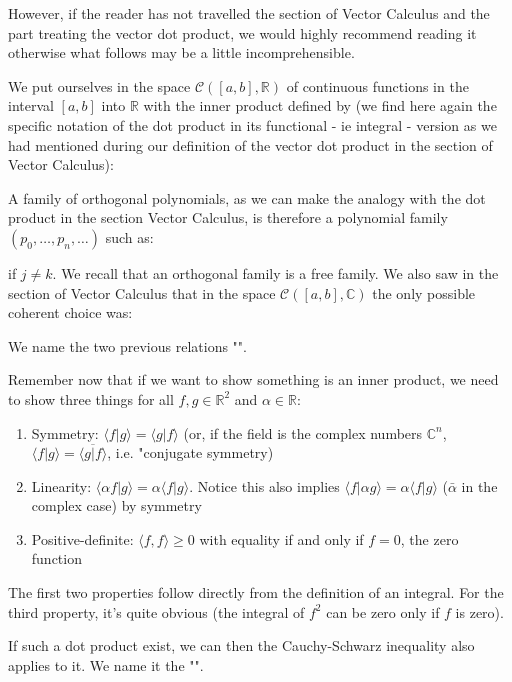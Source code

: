 	However, if the reader has not travelled the section of Vector Calculus and the part treating the vector dot product, we would highly recommend reading it otherwise what follows may be a little incomprehensible.
	
	We put ourselves in the space $\mathcal{C}([a,b],\mathbb{R})$ of continuous functions in the interval $[a, b]$ into $\mathbb{R}$ with the inner product defined by (we find here again the specific notation of the dot product in its functional - ie integral - version as we had mentioned during our definition of the vector dot product in the section of Vector Calculus):
	
	
	A family of orthogonal polynomials, as we can make the analogy with the dot product in the section Vector Calculus, is therefore a polynomial family $(p_0,\ldots ,p_n,\ldots )$ such as:
	
	if $j \ne k$. We recall that an orthogonal family is a free family. We also saw in the section of Vector Calculus that in the space $\mathcal{C}([a,b],\mathbb{C})$ the only possible coherent choice was:
	
	We name the two previous relations "".
	
	Remember now that if we want to show something is an inner product, we need to show three things for all $f,g\in \mathbb{R}^2$ and $\alpha\in \mathbb{R}$:
	\begin{enumerate}
		\item Symmetry: $\langle f|g\rangle=\langle g|f\rangle$ (or, if the field is the complex numbers $\mathbb{C}^n$, $\langle f|g\rangle=\overline{\langle g|f\rangle}$, i.e. "conjugate symmetry)
	
		\item Linearity: $\langle \alpha f|g\rangle=\alpha \langle f|g\rangle$. Notice this also implies $\langle f|\alpha g\rangle=\alpha \langle f|g\rangle$ ($\bar{\alpha}$ in the complex case) by symmetry
	
		\item Positive-definite: $\langle f,f\rangle\geq 0$ with equality if and only if $f=0$, the zero function
	\end{enumerate}
	The first two properties follow directly from the definition of an integral. For the third property, it's quite obvious (the integral of $f^2$ can be zero only if $f$ is zero).
	\begin{tcolorbox}[title=Remark,arc=10pt,breakable,drop lifted shadow,
  skin=enhanced,
  skin first is subskin of={enhancedfirst}{arc=10pt,no shadow},
  skin middle is subskin of={enhancedmiddle}{arc=10pt,no shadow},
  skin last is subskin of={enhancedlast}{drop lifted shadow}]
	If such a dot product exist, we can then the Cauchy-Schwarz inequality also applies to it. We name it the "".
	\end{tcolorbox}
	
